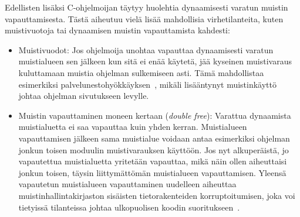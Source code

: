 Edellisten lisäksi C-ohjelmoijan täytyy huolehtia dynaamisesti varatun muistin vapauttamisesta.
Tästä aiheutuu vielä lisää mahdollisia virhetilanteita,
kuten muistivuotoja tai dynaamisen muistin vapauttamista kahdesti:

\begin{itemize}
    \item Muistivuodot: Jos ohjelmoija unohtaa vapauttaa dynaamisesti varatun muistialueen
          sen jälkeen kun sitä ei enää käytetä,
          jää kyseinen muistivaraus kuluttamaan muistia ohjelman sulkemiseen asti.
          Tämä mahdollistaa esimerkiksi palvelunestohyökkäyksen~\cite{SplintLCLint},
          mikäli lisääntynyt muistinkäyttö johtaa ohjelman sivutukseen levylle.
      \item Muistin vapauttaminen moneen kertaan (\emph{double free}):
          Varattua dynaamista muistialuetta ei saa vapauttaa kuin yhden kerran.
          Muistialueen vapauttamisen jälkeen sama muistialue voidaan antaa esimerkiksi
          ohjelman jonkun toisen moduulin muistivarauksen käyttöön.
          Jos nyt alkuperäistä, jo vapautettua muistialuetta yritetään vapauttaa,
          mikä näin ollen aiheuttaisi jonkun toisen, täysin liittymättömän muistialueen vapauttamisen.
          Yleensä vapautetun muistialueen vapauttaminen uudelleen aiheuttaa muistinhallintakirjaston
          sisäisten tietorakenteiden korruptoitumisen,
          joka voi tietyissä tilanteissa johtaa ulkopuolisen koodin suoritukseen~\cite{DoubleFree}.
\end{itemize}

